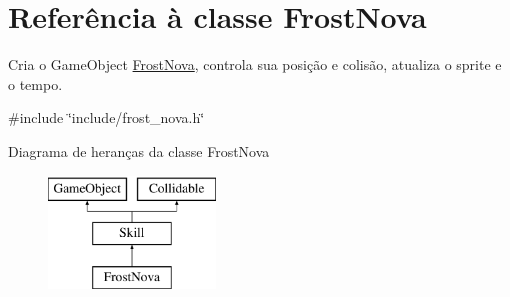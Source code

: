 \hypertarget{classFrostNova}{}\section{Referência à classe Frost\+Nova}
\label{classFrostNova}


Cria o Game\+Object \mbox{\hyperlink{classFrostNova}{Frost\+Nova}}, controla sua posição e colisão, atualiza o sprite e o tempo.  




{\ttfamily \#include \char`\"{}include/frost\+\_\+nova.\+h\char`\"{}}

Diagrama de heranças da classe Frost\+Nova\begin{figure}[H]
\begin{center}
\leavevmode
\includegraphics[height=3.000000cm]{classFrostNova}
\end{center}
\end{figure}

